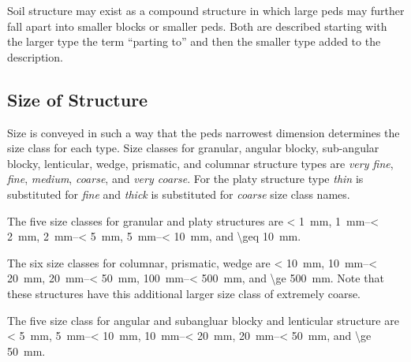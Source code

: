 \documentclass[letterpaper, 12pt]{article}
\begin{document}
Soil structure may exist as a compound structure in which large peds may further fall apart into smaller blocks or smaller peds. Both are described starting with the larger type the term \enquote{parting to} and then the smaller type added to the description.
    
\subsection{Size of Structure}
    
Size is conveyed in such a way that the peds narrowest dimension  determines the size class for each type. Size classes for granular, angular blocky, sub-angular blocky, lenticular, wedge, prismatic, and columnar structure types are \textit{very fine}, \textit{fine}, \textit{medium}, \textit{coarse}, and \textit{very coarse}. For the platy structure type \textit{thin} is substituted for \textit{fine} and \textit{thick} is substituted for \textit{coarse} size class names.

The five size classes for granular and platy structures are \qty{< 1}{\milli\meter}, \qtyrange{1}{< 2}{\milli\meter}, \qtyrange{2}{< 5}{\milli\meter}, \qtyrange{5}{< 10}{\milli\meter}, and \qty{\geq 10}{\milli\meter}.

The six size classes for columnar, prismatic, wedge are \qty{< 10}{mm}, \qtyrange{10}{< 20}{mm}, \qtyrange{20}{< 50}{mm}, \qtyrange{100}{< 500}{mm}, and \qty{\ge 500}{mm}. Note that these structures have this additional larger size class of extremely coarse.

The five size class for angular and subangluar blocky and lenticular structure are \qty{< 5}{mm}, \qtyrange{5}{< 10}{mm}, \qtyrange{10}{< 20}{mm}, \qtyrange{20}{< 50}{mm}, and \qty{\ge 50}{mm}.

\end{document}
